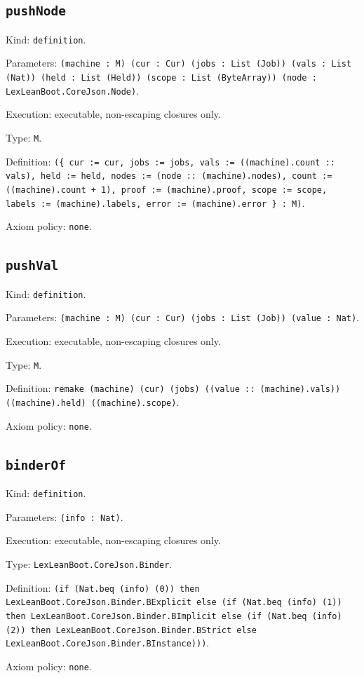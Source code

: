 \documentclass[11pt]{article}
\begin{document}
\subsection*{\texttt{pushNode}}
\noindent Kind: \texttt{definition}.\par
\noindent Parameters: \texttt{(machine : M) (cur : Cur) (jobs : List (Job)) (vals : List (Nat)) (held : List (Held)) (scope : List (ByteArray)) (node : LexLeanBoot.CoreJson.Node)}.\par
\noindent Execution: executable, non-escaping closures only.\par
\noindent Type: \texttt{M}.\par
\noindent Definition: \texttt{(\{ cur := cur, jobs := jobs, vals := ((machine).count :: vals), held := held, nodes := (node :: (machine).nodes), count := ((machine).count + 1), proof := (machine).proof, scope := scope, labels := (machine).labels, error := (machine).error \} : M)}.\par
\noindent Axiom policy: \texttt{none}.\par
\subsection*{\texttt{pushVal}}
\noindent Kind: \texttt{definition}.\par
\noindent Parameters: \texttt{(machine : M) (cur : Cur) (jobs : List (Job)) (value : Nat)}.\par
\noindent Execution: executable, non-escaping closures only.\par
\noindent Type: \texttt{M}.\par
\noindent Definition: \texttt{remake (machine) (cur) (jobs) ((value :: (machine).vals)) ((machine).held) ((machine).scope)}.\par
\noindent Axiom policy: \texttt{none}.\par
\subsection*{\texttt{binderOf}}
\noindent Kind: \texttt{definition}.\par
\noindent Parameters: \texttt{(info : Nat)}.\par
\noindent Execution: executable, non-escaping closures only.\par
\noindent Type: \texttt{LexLeanBoot.CoreJson.Binder}.\par
\noindent Definition: \texttt{(if (Nat.beq (info) (0)) then LexLeanBoot.CoreJson.Binder.BExplicit else (if (Nat.beq (info) (1)) then LexLeanBoot.CoreJson.Binder.BImplicit else (if (Nat.beq (info) (2)) then LexLeanBoot.CoreJson.Binder.BStrict else LexLeanBoot.CoreJson.Binder.BInstance)))}.\par
\noindent Axiom policy: \texttt{none}.\par
\end{document}
